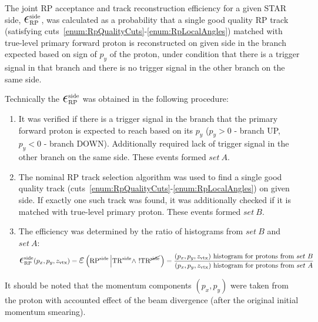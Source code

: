 The joint RP acceptance and track reconstruction efficiency for a given STAR side, $\mbox{\LARGE$\epsilon$}_{\text{RP}}^{\text{side}}$, was calculated as a probability that a single good quality RP track (satisfying cuts~\ref{enum:RpQualityCuts}-\ref{enum:RpLocalAngles}) matched with true-level primary forward proton is reconstructed on given side in the branch expected based on sign of $p_{y}$ of the proton, under condition that there is a trigger signal in that branch and there is no trigger signal in the other branch on the same side.

Technically the $\mbox{\LARGE$\epsilon$}_{\text{RP}}^{\text{side}}$ was obtained in the following procedure:
\begin{enumerate}
	\item It was verified if there is a trigger signal in the branch that the primary forward proton is expected to reach based on its $p_{y}$ ($p_{y}>0$ - branch UP, $p_{y}<0$ - branch DOWN). Additionally required lack of trigger signal in the other branch on the same side. These events formed $set~A$.
	\item The nominal RP track selection algorithm was used to find a single good quality track (cuts~\ref{enum:RpQualityCuts}-\ref{enum:RpLocalAngles}) on given side. If exactly one such track was found, it was additionally checked if it is matched with true-level primary proton. These events formed $set~B$.
	\item The efficiency was determined by the ratio of histograms from $set~B$ and $set~A$:
	\begin{equation}\label{eq:rpEffDef}
 \mbox{\LARGE$\epsilon$}_{\text{RP}}^{\text{side}}(p_{x}, p_{y}, z_{\text{vtx}}) = \mbox{\LARGE$\varepsilon$}\left(\RPSIDE\left|\TRSIDE\land~!\TRNSIDE\right.\right) = %
 \frac{(p_{x}, p_{y}, z_{\text{vtx}})~\text{histogram for protons from}~set~B}{(p_{x}, p_{y}, z_{\text{vtx}})~\text{histogram for protons from}~set~A}
  \end{equation}
	
\end{enumerate}

It should be noted that the momentum components $(p_{x}, p_{y})$ were taken from the proton with accounted effect of the beam divergence (after the original initial momentum smearing).

